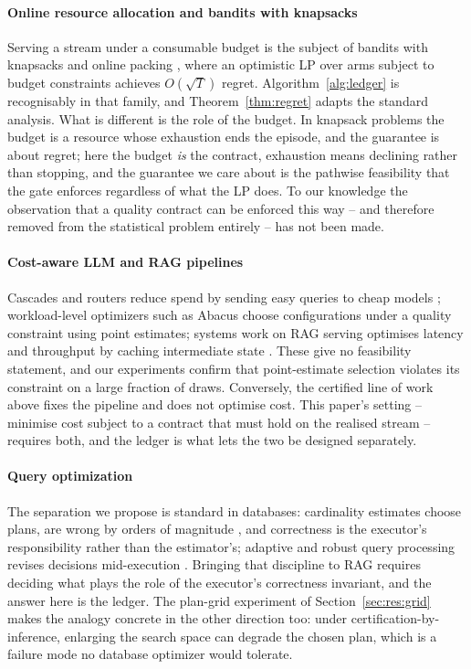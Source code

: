 \paragraph{Online resource allocation and bandits with knapsacks}
Serving a stream under a consumable budget is the subject of bandits with
knapsacks \citep{badanidiyuru2018bwk,agrawal2014bwk} and online packing
\citep{devanur2019adwords}, where an optimistic LP over arms subject to
budget constraints achieves $O(\sqrt{T})$ regret. Algorithm~\ref{alg:ledger}
is recognisably in that family, and Theorem~\ref{thm:regret} adapts the
standard analysis. What is different is the role of the budget. In
knapsack problems the budget is a resource whose exhaustion ends the
episode, and the guarantee is about regret; here the budget \emph{is} the
contract, exhaustion means declining rather than stopping, and the
guarantee we care about is the pathwise feasibility that the gate
enforces regardless of what the LP does. To our knowledge the observation
that a quality contract can be enforced this way -- and therefore removed
from the statistical problem entirely -- has not been made.

\paragraph{Cost-aware LLM and RAG pipelines}
Cascades and routers reduce spend by sending easy queries to cheap models
\citep{chen2023frugalgpt,ding2024hybridllm,hu2024routerbench,
jeong2024adaptiverag}; workload-level optimizers such
as Abacus \citep{russo2025abacus} choose configurations under a quality
constraint using point estimates; systems work on RAG serving optimises
latency and throughput by caching intermediate state
\citep{jin2024ragcache}.
These give no feasibility statement, and our experiments confirm that
point-estimate selection violates its constraint on a large fraction of
draws. Conversely, the certified line of work above fixes the pipeline
and does not optimise cost. This paper's setting -- minimise cost subject
to a contract that must hold on the realised stream -- requires both, and
the ledger is what lets the two be designed separately.

\paragraph{Query optimization}
The separation we propose is standard in databases: cardinality estimates
choose plans, are wrong by orders of magnitude \citep{leis2015good}, and
correctness is the executor's responsibility rather than the estimator's;
adaptive and robust query processing revises decisions mid-execution
\citep{avnur2000eddies,babu2005proactive,markl2004robust}. Bringing that
discipline to RAG requires deciding what plays the role of the executor's
correctness invariant, and the answer here is the ledger. The plan-grid
experiment of Section~\ref{sec:res:grid} makes the analogy concrete in the
other direction too: under certification-by-inference, enlarging the
search space can degrade the chosen plan, which is a failure mode no
database optimizer would tolerate.

